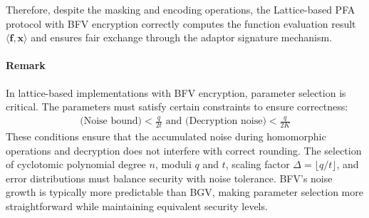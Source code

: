Therefore, despite the masking and encoding operations, the Lattice-based PFA protocol with BFV encryption correctly computes the function evaluation result $\langle \mathbf{f}, \mathbf{x} \rangle$ and ensures fair exchange through the adaptor signature mechanism.

\paragraph{Remark}
In lattice-based implementations with BFV encryption, parameter selection is critical. The parameters must satisfy certain constraints to ensure correctness:
\begin{align*}
    \text{(Noise bound)} < \frac{q}{2t} \text{ and } \text{(Decryption noise)} < \frac{q}{2K}
\end{align*}
These conditions ensure that the accumulated noise during homomorphic operations and decryption does not interfere with correct rounding. The selection of cyclotomic polynomial degree $n$, moduli $q$ and $t$, scaling factor $\Delta = \lfloor q/t \rfloor$, and error distributions must balance security with noise tolerance. BFV's noise growth is typically more predictable than BGV, making parameter selection more straightforward while maintaining equivalent security levels.